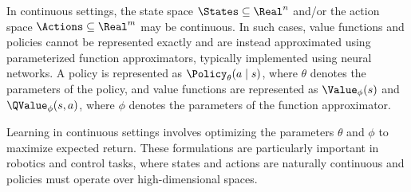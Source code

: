 In continuous settings, the state space $\States \subseteq \Real^n$ and/or the action space $\Actions \subseteq \Real^m$ may be continuous. In such cases, value functions and policies cannot be represented exactly and are instead approximated using parameterized function approximators, typically implemented using neural networks. 
A policy is represented as $\Policy_{\theta}(a \mid s)$, where $\theta$ denotes the parameters of the policy, and value functions are represented as $\Value_{\phi}(s)$ and $\QValue_{\phi}(s,a)$, where $\phi$ denotes the parameters of the function approximator.

Learning in continuous settings involves optimizing the parameters $\theta$ and $\phi$ to maximize expected return. These formulations are particularly important in robotics and control tasks, where states and actions are naturally continuous and policies must operate over high-dimensional spaces.